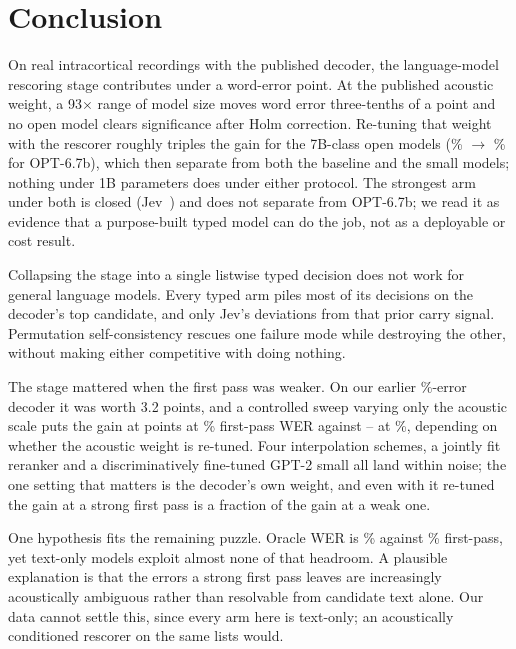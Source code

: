 \documentclass[11pt]{article}
\begin{document}
\section{Conclusion}

On real intracortical recordings with the published decoder, the language-model rescoring
stage contributes under a word-error point. At the published acoustic weight, a 93$\times$
range of model size moves word error three-tenths of a point and no open model clears
significance after Holm correction. Re-tuning that weight with the rescorer roughly triples
the gain for the 7B-class open models (\werNone\% $\rightarrow$ \werOptJoint\% for
OPT-6.7b), which then separate from both the baseline and the small models; nothing under
1B parameters does under either protocol. The strongest arm under both is closed
(Jev~\cite{typesafe2026jev}) and does not separate from OPT-6.7b; we read it as evidence
that a purpose-built typed model can do the job, not as a deployable or cost result.

Collapsing the stage into a single listwise typed decision does not work for general
language models. Every typed arm piles most of its decisions on the decoder's top
candidate, and only Jev's deviations from that prior carry signal. Permutation
self-consistency rescues one failure mode while destroying the other, without making
either competitive with doing nothing.

The stage mattered when the first pass was weaker. On our earlier \werNoneWeak\%-error
decoder it was worth 3.2 points, and a controlled sweep varying only the acoustic scale
puts the gain at \gainWeak{} points at \fpWeakSweep\% first-pass WER against
\gainStrong--\gainOptJoint{} at \werNone\%, depending on whether the acoustic weight is
re-tuned. Four interpolation schemes, a jointly fit reranker and a discriminatively
fine-tuned GPT-2 small all land within noise; the one setting that matters is the
decoder's own weight, and even with it re-tuned the gain at a strong first pass is a
fraction of the gain at a weak one.

One hypothesis fits the remaining puzzle. Oracle WER is \oracleWer\% against \werNone\%
first-pass, yet text-only models exploit almost none of that headroom. A plausible
explanation is that the errors a strong first pass leaves are increasingly acoustically
ambiguous rather than resolvable from candidate text alone. Our data cannot settle this,
since every arm here is text-only; an acoustically conditioned rescorer on the same lists
would.
\end{document}
